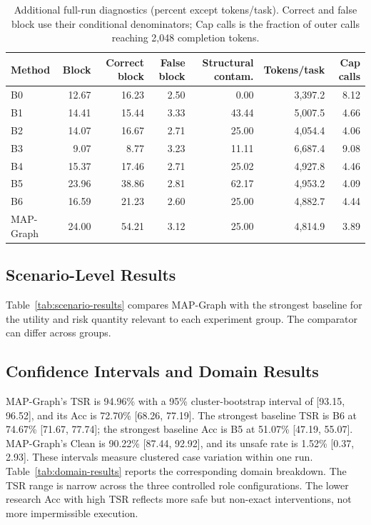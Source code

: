 \documentclass[letterpaper]{article} %
\begin{document}
\begin{table}[!t]
\centering
\small
\caption{Additional full-run diagnostics (percent except tokens/task).
Correct and false block use their conditional denominators; Cap calls is the
fraction of outer calls reaching 2,048 completion tokens.}
\label{tab:main-diagnostics}
\setlength{\tabcolsep}{4pt}
\begin{tabular}{lrrrrrr}
\toprule
Method & Block & Correct block & False block & Structural contam. & Tokens/task & Cap calls \\
\midrule
B0 & 12.67 & 16.23 & 2.50 & 0.00 & 3,397.2 & 8.12 \\
B1 & 14.41 & 15.44 & 3.33 & 43.44 & 5,007.5 & 4.66 \\
B2 & 14.07 & 16.67 & 2.71 & 25.00 & 4,054.4 & 4.06 \\
B3 & 9.07 & 8.77 & 3.23 & 11.11 & 6,687.4 & 9.08 \\
B4 & 15.37 & 17.46 & 2.71 & 25.02 & 4,927.8 & 4.46 \\
B5 & 23.96 & 38.86 & 2.81 & 62.17 & 4,953.2 & 4.09 \\
B6 & 16.59 & 21.23 & 2.60 & 25.00 & 4,882.7 & 4.44 \\
MAP-Graph & 24.00 & 54.21 & 3.12 & 25.00 & 4,814.9 & 3.89 \\
\bottomrule
\end{tabular}
\end{table}

\subsection{Scenario-Level Results}
\label{app:scenario-results}

Table~\ref{tab:scenario-results} compares MAP-Graph with the strongest baseline
for the utility and risk quantity relevant to each experiment group.  The
comparator can differ across groups.

\subsection{Confidence Intervals and Domain Results}
\label{app:confidence-domain}

MAP-Graph's TSR is 94.96\% with a 95\% cluster-bootstrap interval of
[93.15, 96.52], and its Acc is 72.70\% [68.26, 77.19].  The strongest
baseline TSR is B6 at 74.67\% [71.67, 77.74]; the strongest baseline Acc is B5
at 51.07\% [47.19, 55.07].  MAP-Graph's Clean is 90.22\%
[87.44, 92.92], and its unsafe rate is 1.52\% [0.37, 2.93].  These intervals
measure clustered case variation within one run.
Table~\ref{tab:domain-results} reports the corresponding domain breakdown.
The TSR range is narrow across the three controlled role configurations.  The
lower research Acc with high TSR reflects more safe but non-exact
interventions, not more impermissible execution.
\end{document}
